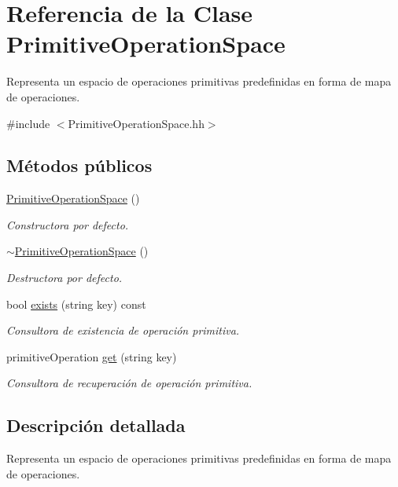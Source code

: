 \hypertarget{class_primitive_operation_space}{}\section{Referencia de la Clase Primitive\+Operation\+Space}
\label{class_primitive_operation_space}


Representa un espacio de operaciones primitivas predefinidas en forma de mapa de operaciones.  




{\ttfamily \#include $<$Primitive\+Operation\+Space.\+hh$>$}

\subsection*{Métodos públicos}
\begin{DoxyCompactItemize}
\item 
\hyperlink{class_primitive_operation_space_a8213986669f4d655d23c73313d982b46}{Primitive\+Operation\+Space} ()
\begin{DoxyCompactList}\small\item\em Constructora por defecto. \end{DoxyCompactList}\item 
\hyperlink{class_primitive_operation_space_a76e59fa7a125f95689faa84d59f2e0d1}{$\sim$\+Primitive\+Operation\+Space} ()
\begin{DoxyCompactList}\small\item\em Destructora por defecto. \end{DoxyCompactList}\item 
bool \hyperlink{class_primitive_operation_space_ada17e99cdecb0f8113dfcdf11f4d9e38}{exists} (string key) const 
\begin{DoxyCompactList}\small\item\em Consultora de existencia de operación primitiva. \end{DoxyCompactList}\item 
primitive\+Operation \hyperlink{class_primitive_operation_space_abac38eedfb2f0acc93822a88fe2501ef}{get} (string key)
\begin{DoxyCompactList}\small\item\em Consultora de recuperación de operación primitiva. \end{DoxyCompactList}\end{DoxyCompactItemize}


\subsection{Descripción detallada}
Representa un espacio de operaciones primitivas predefinidas en forma de mapa de operaciones. 

